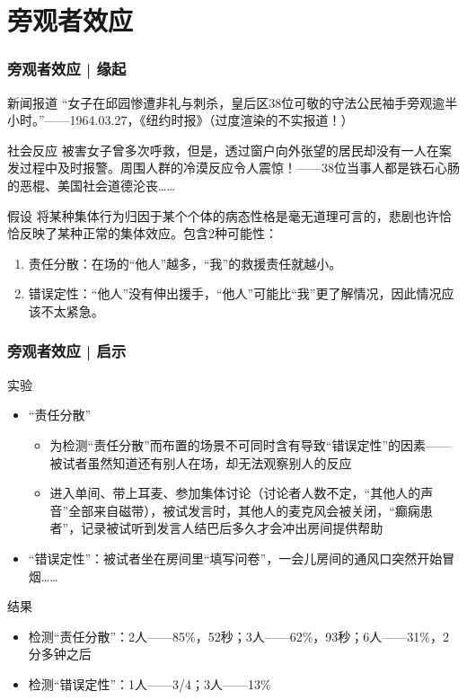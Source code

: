 \section{旁观者效应}
\begin{frame}
  \frametitle{旁观者效应 | 缘起}
  \begin{block}{新闻报道}
    “女子在邱园惨遭非礼与刺杀，皇后区38位可敬的守法公民袖手旁观逾半小时。”——1964.03.27，《纽约时报》（过度渲染的不实报道！）
  \end{block}
  \pause
  \begin{block}{社会反应}
    被害女子曾多次呼救，但是，透过窗户向外张望的居民却没有一人在案发过程中及时报警。周围人群的冷漠反应令人震惊！——38位当事人都是铁石心肠的恶棍、美国社会道德沦丧……
  \end{block}
  \pause
  \begin{block}{假设}
    将某种集体行为归因于某个个体的病态性格是毫无道理可言的，悲剧也许恰恰反映了某种正常的集体效应。包含2种可能性：
    \begin{enumerate}
      \item 责任分散：在场的“他人”越多，“我”的救援责任就越小。
      \item 错误定性：“他人”没有伸出援手，“他人”可能比“我”更了解情况，因此情况应该不太紧急。
    \end{enumerate}
  \end{block}
\end{frame}

\begin{frame}
  \frametitle{旁观者效应 | 启示}
  \begin{block}{实验}
    \begin{itemize}
      \item “责任分散”
        \begin{itemize}
          \item 为检测“责任分散”而布置的场景不可同时含有导致“错误定性”的因素——被试者虽然知道还有别人在场，却无法观察别人的反应
          \item 进入单间、带上耳麦、参加集体讨论（讨论者人数不定，“其他人的声音”全部来自磁带），被试发言时，其他人的麦克风会被关闭，“癫痫患者”，记录被试听到发言人结巴后多久才会冲出房间提供帮助
        \end{itemize}
      \item “错误定性”：被试者坐在房间里“填写问卷”，一会儿房间的通风口突然开始冒烟……
    \end{itemize}
  \end{block}
  \pause
  \begin{block}{结果}
    \begin{itemize}
      \item 检测“责任分散”：2人——85\%，52秒；3人——62\%，93秒；6人——31\%，2分多钟之后
      \item 检测“错误定性”：1人——3/4；3人——13\%
    \end{itemize}
  \end{block}
\end{frame}

